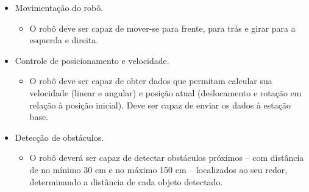 \begin{itemize} %

  \item Movimentação do robô.
    \begin{itemize}
      \item O robô deve ser capaz de mover-se para frente, para trás e girar para a esquerda e direita.
    \end{itemize}

  \item Controle de posicionamento e velocidade.
    \begin{itemize}
      \item O robô deve ser capaz de obter dados que permitam calcular sua velocidade (linear e angular) e posição atual (deslocamento e rotação em relação à posição inicial). Deve ser capaz de enviar os dados à estação base.
    \end{itemize}

  \item Detecção de obstáculos.
    \begin{itemize}
      \item O robô deverá ser capaz de detectar obstáculos próximos -- com distância de no mínimo 30 cm e no máximo 150 cm -- localizados ao seu redor, determinando a distância de cada objeto detectado.
    \end{itemize}

\end{itemize} %

